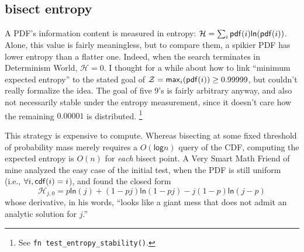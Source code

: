 \documentclass[11pt]{sigplanconf}
\begin{document}
%
%
% 
%
%
%
%
%
%
%


\subsection{bisect entropy}

\newcommand\entropy{\ensuremath{\mathcal{H}}\xspace}

A PDF's information content is measured in entropy:
$\entropy = \sum_i \pdf(i)\mathsf{ln}(\pdf(i))$.
Alone, this value is fairly meaningless, but to compare them,
a spikier PDF has lower entropy than a flatter one.
Indeed,
when the search terminates in Determinism World, $\entropy = 0$.
I thought for a while about how to link ``minimum expected entropy''
to the stated goal %
of
$\mathcal{Z} = \mathsf{max}_i (\mathsf{pdf}(i)) \ge 0.99999$,
but couldn't really formalize the idea.
The goal of five 9's is fairly arbitrary anyway,
and also not necessarily stable under the entropy measurement,
since it doesn't care how the remaining $0.00001$ is distributed.%
\footnote{See {\tt fn test\_entropy\_stability()}.}

This strategy is expensive to compute.
Whereas bisecting at some fixed threshold of probability mass merely requires a $O(\mathsf{log}  n)$ query of the CDF,
computing the expected entropy is $O(n)$ for {\it each} bisect point.
A Very Smart Math Friend of mine \cite{primer} analyzed the easy case of the initial test,
when the PDF is still uniform (i.e., $\forall i, \mathsf{cdf}(i) = i$),
and found the closed form
\[
	\entropy_{j,0} = p \mathsf{ln}(j)
	+
	(1-pj) \mathsf{ln} (1-pj)
	-
	j(1-p) \mathsf{ln} (j-p)
\]
whose derivative,
in his words,
``looks like a giant mess that does not admit an analytic solution for $j$.''
\end{document}
